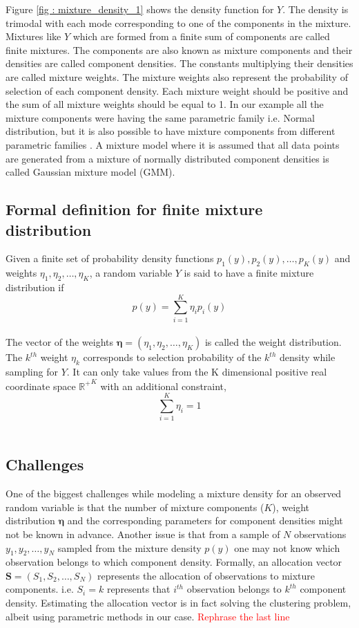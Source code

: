 Figure \ref{fig : mixture_density_1} shows the density function for $Y$. The density is trimodal with each mode corresponding to one of the components in the mixture. Mixtures like $Y$ which are formed from a finite sum of components are called finite mixtures. The components are also known as mixture components and their densities are called component densities. The constants multiplying their densities are called mixture weights. The mixture weights also represent the probability of selection of each component density. Each mixture weight should be positive and the sum of all mixture weights should be equal to 1. In our example all the  mixture components were having the same parametric family i.e. Normal distribution, but it is also possible to have mixture components from different parametric families \citep[pg. 4]{fruhwirth-schnatter_finite_2013}. A mixture model where it is assumed that all data points are generated from a mixture of normally distributed component densities is called Gaussian mixture model (GMM).\\

\subsection{Formal definition for finite mixture distribution}
\label{subsec : formal_def_mixture_dist}
Given a finite set of probability density functions $p_1(y), p_2(y), \ldots, p_K(y)$ and weights $\eta_1, \eta_2, \ldots, \eta_K$, a random variable $Y$ is said to have a finite mixture distribution if\\
$$p(y) = \sum_{i=1}^{K} \eta_{i} p_{i}(y)$$\\
The vector of the weights $\boldsymbol{\eta} = (\eta_1, \eta_2, \ldots, \eta_K)$ is called the weight distribution. The $k^{th}$ weight $\eta_{k}$ corresponds to selection probability of the $k^{th}$ density while sampling for $Y$. It can only take values from the K dimensional positive real coordinate space ${\mathbb{R}^{+}}^K$ with an additional constraint,\\
$$\sum_{i=1}^{K} \eta_{i} = 1$$\\

\subsection{Challenges}
\label{subsec : challenges_mixture_density}
One of the biggest challenges while modeling a mixture density for an observed random variable is that the number of mixture components ($K$), weight distribution $\boldsymbol{\eta}$ and the corresponding parameters for component densities might not be known in advance. Another issue is that from a sample of $N$ observations $y_1, y_2, \ldots, y_N$ sampled from the mixture density $p(y)$ one may not know which observation belongs to which component density. Formally, an allocation vector $\boldsymbol{S} = (S_1, S_2, \ldots, S_N)$ represents the allocation of observations to mixture components. i.e. $S_i = k$ represents that $i^{th}$ observation belongs to $k^{th}$ component density. Estimating the allocation vector is in fact solving the clustering problem, albeit using parametric methods in our case. \textcolor{red}{Rephrase the last line}\\

